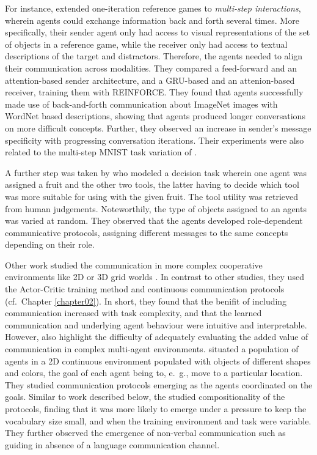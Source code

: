 For instance, \cite{evtimova2017emergent} extended one-iteration reference games to \textit{multi-step interactions}, wherein agents could exchange information back and forth several times. More specifically, their sender agent only had access to visual representations of the set of objects in a reference game, while the receiver only had access to textual descriptions of the target and distractors. Therefore, the agents needed to align their communication across modalities. They compared a feed-forward and an attention-based sender architecture, and a GRU-based and an attenion-based receiver, training them with REINFORCE. They found that agents successfully made use of back-and-forth communication about ImageNet images with WordNet based descriptions, showing that agents produced longer conversations on more difficult concepts. Further, they observed an increase in sender's message specificity with progressing conversation iterations.
Their experiments were also related to the multi-step MNIST task variation of \cite{foerster2016learning}.

A further step was taken by \cite{bouchacourt2019miss} who modeled a decision task wherein one agent was assigned a fruit and the other two tools, the latter having to decide which tool was more suitable for using with the given fruit. The tool utility was retrieved from human judgements. Noteworthily, the type of objects assigned to an agents was varied at random. They observed that the agents developed role-dependent communicative protocols, assigning different messages to the same concepts depending on their role. 

Other work studied the communication in more complex cooperative environments like 2D or 3D grid worlds \parencite{das2019tarmac}. In contrast to other studies, they used the Actor-Critic training method and continuous communication protocols (cf.~Chapter \ref{chapter02}). In short, they found that the benifit of including communication increased with task complexity, and that the learned communication and underlying agent behaviour were intuitive and interpretable. However, \cite{lowe2019pitfalls} also highlight the difficulty of adequately evaluating the added value of communication in complex multi-agent environments. \cite{mordatch2018emergence} situated a population of agents in a 2D continuous environment populated with objects of different shapes and colors, the goal of each agent being to, e.~g., move to a particular location. They studied communication protocols emerging as the agents coordinated on the goals. Similar to work described below, the studied compositionality of the protocols, finding that it was more likely to emerge under a pressure to keep the vocabulary size small, and when the training environment and task were variable. They further observed the emergence of non-verbal communication such as guiding in absence of a language communication channel.

